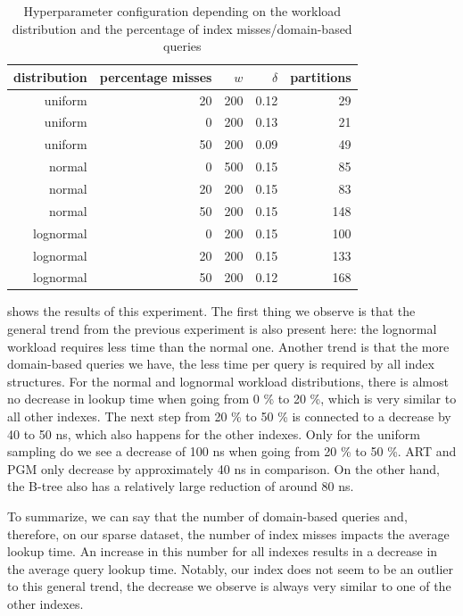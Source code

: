 \begin{table}[ht]
\centering
\begin{tabular}{rrrrr}
\hline
distribution & percentage misses & $w$   & $\delta$ & partitions \\ \hline
uniform      & 20                & 200  & 0.12      & 29         \\
uniform      & 0                 & 200  & 0.13      & 21         \\
uniform      & 50                & 200  & 0.09      & 49         \\
normal       & 0                 & 500  & 0.15      & 85         \\
normal       & 20                & 200  & 0.15      & 83         \\
normal       & 50                & 200  & 0.15      & 148        \\
lognormal    & 0                 & 200  & 0.15      & 100        \\
lognormal    & 20                & 200  & 0.15      & 133        \\
lognormal    & 50                & 200  & 0.12      & 168        \\ \hline
\end{tabular}
\caption{Hyperparameter configuration depending on the workload distribution and the percentage of index misses/domain-based queries}
\label{tab:indexmisses}
\end{table}

 shows the results of this experiment. The first thing we observe is that the general trend from the previous experiment is also present here: the lognormal workload requires less time than the normal one. Another trend is that the more domain-based queries we have, the less time per query is required by all index structures. For the normal and lognormal workload distributions, there is almost no decrease in lookup time when going from 0 \% to 20 \%, which is very similar to all other indexes. The next step from 20 \% to 50 \% is connected to a decrease by 40 to 50 ns, which also happens for the other indexes. Only for the uniform sampling do we see a decrease of 100 ns when going from 20 \% to 50 \%. ART and PGM only decrease by approximately 40 ns in comparison. On the other hand, the B-tree also has a relatively large reduction of around 80 ns.

To summarize, we can say that the number of domain-based queries and, therefore, on our sparse dataset, the number of index misses impacts the average lookup time. An increase in this number for all indexes results in a decrease in the average query lookup time. Notably, our index does not seem to be an outlier to this general trend, the decrease we observe is always very similar to one of the other indexes.

